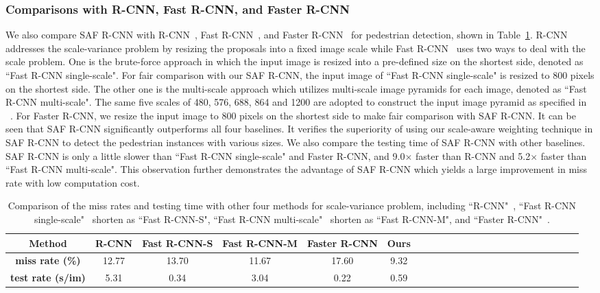 \documentclass[journal]{IEEEtran}
\begin{document}
\subsubsection{Comparisons with R-CNN, Fast R-CNN, and Faster R-CNN}
We also compare SAF R-CNN with R-CNN~\cite{girshick2014rich}, Fast R-CNN~\cite{girshick2015fast}, and Faster R-CNN~\cite{ren2015faster} for pedestrian detection, shown in Table~\ref{tab:fast_rcnn}. R-CNN~\cite{girshick2014rich} addresses the scale-variance problem by resizing the proposals into a fixed image scale while Fast R-CNN~\cite{girshick2015fast} uses two ways to deal with the scale problem. One is the brute-force approach in which the input image is resized into a pre-defined size on the shortest side, denoted as ``Fast R-CNN single-scale". For fair comparison with our SAF R-CNN, the input image of ``Fast R-CNN single-scale" is resized to 800 pixels on the shortest side. The other one is the multi-scale approach which utilizes multi-scale image pyramids for each image, denoted as ``Fast R-CNN multi-scale". The same five scales of 480, 576, 688, 864 and 1200 are adopted to construct the input image pyramid as specified in ~\cite{he2014spatial}. For Faster R-CNN, we resize the input image to 800 pixels on the shortest side to make fair comparison with SAF R-CNN. It can be seen that SAF R-CNN significantly outperforms all four baselines. It verifies the superiority of using our scale-aware weighting technique in SAF R-CNN to detect the pedestrian instances with various sizes. We also compare the testing time of SAF R-CNN with other baselines. SAF R-CNN is only a little slower than ``Fast R-CNN single-scale" and Faster R-CNN, and 9.0$\times$ faster than R-CNN and 5.2$\times$ faster than ``Fast R-CNN multi-scale". This observation further demonstrates the advantage of SAF R-CNN which yields a large improvement in miss rate with low computation cost.

\begin{table}\setlength{\tabcolsep}{3pt}
	\centering\scriptsize
	\caption{Comparison of the miss rates and testing time with other four methods for scale-variance problem, including ``R-CNN"~\cite{girshick2014rich}, ``Fast R-CNN single-scale"~\cite{girshick2015fast} shorten as ``Fast R-CNN-S", ``Fast R-CNN multi-scale"~\cite{girshick2015fast} shorten as ``Fast R-CNN-M", and ``Faster R-CNN"~\cite{ren2015faster}.}\label{tab:fast_rcnn}
	\renewcommand{\arraystretch}{1.3}
	\begin{tabular}{c|c|c|c|c|cccccccccccccccccc}
\hline
		\textbf{Method} &\textbf{R-CNN} &\textbf{Fast R-CNN-S} &\textbf{Fast R-CNN-M} &\textbf{Faster R-CNN} &\textbf{Ours} \\
		\hline
		\textbf{miss rate (\%)} & 12.77 & 13.70 & 11.67 & 17.60 & 9.32 \\
		\textbf{test rate (s/im)}  & 5.31 & 0.34 & 3.04 & 0.22 & 0.59 \\
\hline
	\end{tabular}\end{table}
\end{document}
